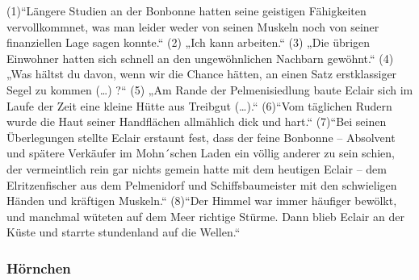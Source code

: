 (1)“Längere Studien an der Bonbonne hatten seine geistigen Fähigkeiten vervollkommnet, was man leider weder von seinen Muskeln noch von seiner finanziellen Lage sagen konnte.“
(2) „Ich kann arbeiten.“
(3) „Die übrigen Einwohner hatten sich schnell an den ungewöhnlichen Nachbarn gewöhnt.“
(4) „Was hältst du davon, wenn wir die Chance hätten, an einen Satz erstklassiger Segel zu kommen (…) ?“
(5) „Am Rande der Pelmenisiedlung baute Eclair sich im Laufe der Zeit eine kleine Hütte aus Treibgut (…).“ 
(6)“Vom täglichen Rudern wurde die Haut seiner Handflächen allmählich dick und hart.“
(7)“Bei seinen Überlegungen stellte Eclair erstaunt fest, dass der feine Bonbonne – Absolvent und spätere Verkäufer im Mohn´schen Laden ein völlig anderer zu sein schien, der vermeintlich rein gar nichts gemein hatte mit dem heutigen Eclair – dem Elritzenfischer aus dem Pelmenidorf und Schiffsbaumeister mit den schwieligen Händen und kräftigen Muskeln.“
(8)“Der Himmel war immer häufiger bewölkt, und manchmal wüteten auf dem Meer richtige Stürme. Dann blieb Eclair an der Küste und starrte stundenland auf die Wellen.“


\subsubsection{Hörnchen}

